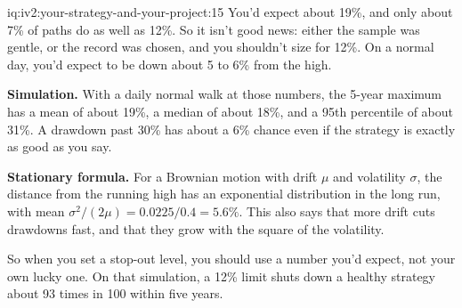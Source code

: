 \begin{solution}{iq:iv2:your-strategy-and-your-project:15}
You'd expect about 19\%, and only about 7\% of paths do as well as 12\%. So it isn't good news: either the sample was gentle, or the record was chosen, and you shouldn't size for 12\%. On a normal day, you'd expect to be down about 5 to 6\% from the high.

\textbf{Simulation.} With a daily normal walk at those numbers, the 5-year maximum has a mean of about 19\%, a median of about 18\%, and a 95th percentile of about 31\%. A drawdown past 30\% has about a 6\% chance even if the strategy is exactly as good as you say.

\textbf{Stationary formula.} For a Brownian motion with drift $\mu$ and volatility $\sigma$, the distance from the running high has an exponential distribution in the long run, with mean $\sigma^2/(2\mu) = 0.0225/0.4 = 5.6\%$. This also says that more drift cuts drawdowns fast, and that they grow with the square of the volatility.

So when you set a stop-out level, you should use a number you'd expect, not your own lucky one. On that simulation, a 12\% limit shuts down a healthy strategy about 93 times in 100 within five years.

\end{solution}

